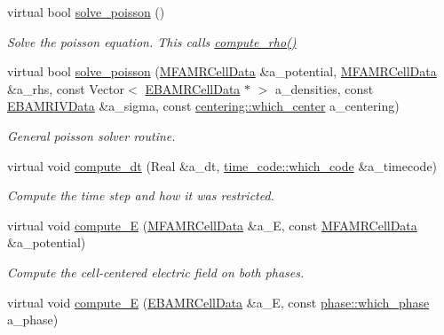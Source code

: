 \begin{DoxyCompactItemize}
virtual bool \hyperlink{classtime__stepper_a85d99adc714844c64799ae8fffdd2db8}{solve\+\_\+poisson} ()
\begin{DoxyCompactList}\small\item\em Solve the poisson equation. This calls \hyperlink{classtime__stepper_a8aff9e5ba857c3f49f719def02ebfc83}{compute\+\_\+rho()} \end{DoxyCompactList}\item 
virtual bool \hyperlink{classtime__stepper_a6bbd9e38c7170b96a3b2164a209847b5}{solve\+\_\+poisson} (\hyperlink{type__definitions_8H_aced885351d40daa466564acbee4042d3}{M\+F\+A\+M\+R\+Cell\+Data} \&a\+\_\+potential, \hyperlink{type__definitions_8H_aced885351d40daa466564acbee4042d3}{M\+F\+A\+M\+R\+Cell\+Data} \&a\+\_\+rhs, const Vector$<$ \hyperlink{type__definitions_8H_a7e610f301989e5e07781c5e338bdb7c3}{E\+B\+A\+M\+R\+Cell\+Data} $\ast$ $>$ a\+\_\+densities, const \hyperlink{type__definitions_8H_a6b8fa905d55cbb491b52180386f0e0c1}{E\+B\+A\+M\+R\+I\+V\+Data} \&a\+\_\+sigma, const \hyperlink{namespacecentering_a2cba3891fbdab30a214ce001478b0c00}{centering\+::which\+\_\+center} a\+\_\+centering)
\begin{DoxyCompactList}\small\item\em General poisson solver routine. \end{DoxyCompactList}\item 
virtual void \hyperlink{classtime__stepper_a1aca2ee15cde9d0f0183f5d2807fda90}{compute\+\_\+dt} (Real \&a\+\_\+dt, \hyperlink{namespacetime__code_a92eaf5cbf7ef106eae01fd0d702e36bf}{time\+\_\+code\+::which\+\_\+code} \&a\+\_\+timecode)
\begin{DoxyCompactList}\small\item\em Compute the time step and how it was restricted. \end{DoxyCompactList}\item 
virtual void \hyperlink{classtime__stepper_aaeed2df5aec944cd499c10f8b7036ea4}{compute\+\_\+E} (\hyperlink{type__definitions_8H_aced885351d40daa466564acbee4042d3}{M\+F\+A\+M\+R\+Cell\+Data} \&a\+\_\+E, const \hyperlink{type__definitions_8H_aced885351d40daa466564acbee4042d3}{M\+F\+A\+M\+R\+Cell\+Data} \&a\+\_\+potential)
\begin{DoxyCompactList}\small\item\em Compute the cell-\/centered electric field on both phases. \end{DoxyCompactList}\item 
virtual void \hyperlink{classtime__stepper_a2468feba3a29655050375d8b693f9115}{compute\+\_\+E} (\hyperlink{type__definitions_8H_a7e610f301989e5e07781c5e338bdb7c3}{E\+B\+A\+M\+R\+Cell\+Data} \&a\+\_\+E, const \hyperlink{namespacephase_a23c76f548a5eb1955ed8c929c541108b}{phase\+::which\+\_\+phase} a\+\_\+phase)

\end{DoxyCompactItemize}
